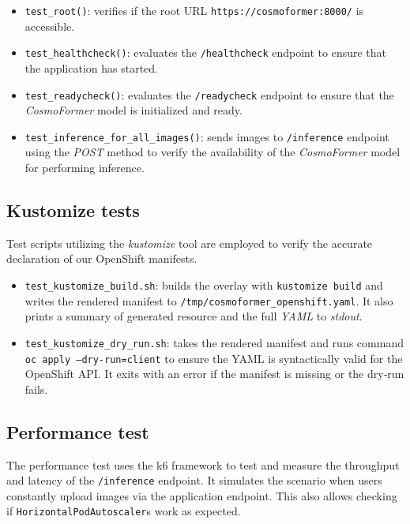 \begin{itemize}
  \item \texttt{test\_root()}: verifies if the root URL \texttt{https://cosmoformer:8000/} is accessible.
  \item \texttt{test\_healthcheck()}: evaluates the \texttt{/healthcheck} endpoint to ensure that the application has started.
  \item \texttt{test\_readycheck()}: evaluates the \texttt{/readycheck} endpoint to ensure that the \textit{CosmoFormer} model is initialized and ready.
  \item \texttt{test\_inference\_for\_all\_images()}: sends images to \texttt{/inference} endpoint using the \textit{POST} method to verify the availability of the \textit{CosmoFormer} model for performing inference.  
\end{itemize}

\subsection*{Kustomize tests}

Test scripts utilizing the \textit{kustomize} tool are employed to verify the accurate declaration of our OpenShift manifests.

\begin{itemize}
  \item \texttt{test\_kustomize\_build.sh}: builds the overlay with \texttt{kustomize build} and writes the rendered manifest to \texttt{/tmp/cosmoformer\_openshift.yaml}. It also prints a summary of generated resource and the full \textit{YAML} to \textit{stdout}.
  \item \texttt{test\_kustomize\_dry\_run.sh}: takes the rendered manifest and runs command \texttt{oc apply --dry-run=client} to ensure the YAML is syntactically valid for the OpenShift API. It exits with an error if the manifest is missing or the dry‑run fails.
\end{itemize}

\subsection*{Performance test}

The performance test uses the k6 framework to test and measure the throughput and latency of the \texttt{/inference} endpoint. It simulates the scenario when users constantly upload images via the application endpoint. This also allows checking if \texttt{HorizontalPodAutoscaler}s  work as expected. 

